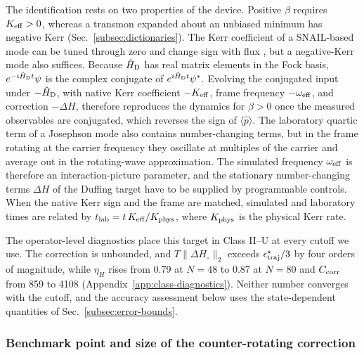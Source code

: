 \documentclass[pra,twocolumn,superscriptaddress,nofootinbib,floatfix]{revtex4-2}
\theoremstyle{remark}
\newcommand{\revcolor}{\color{blue}}
\DeclareRobustCommand{\rev}[1]{{\revcolor #1}}
\begin{document}
\rev{The identification rests on two properties of the device.} \rev{Positive \(\beta\) requires \(K_{\rm eff}>0\), whereas a transmon expanded about an unbiased minimum has negative Kerr (Sec.~\ref{subsec:dictionaries}).} \rev{The Kerr coefficient of a SNAIL-based mode can be tuned through zero and change sign with flux \cite{Sivak2019Kerrfree}, but a negative-Kerr mode also suffices.} \rev{Because \(\hat H_{\rm D}\) has real matrix elements in the Fock basis, \(e^{-i\hat H_{\rm D}t}\psi\) is the complex conjugate of \(e^{i\hat H_{\rm D}t}\psi^*\).} \rev{Evolving the conjugated input under \(-\hat H_{\rm D}\), with native Kerr coefficient \(-K_{\rm eff}\), frame frequency \(-\omega_{\rm eff}\), and correction \(-\Delta H\), therefore reproduces the dynamics for \(\beta>0\) once the measured observables are conjugated, which reverses the sign of \(\langle\hat p\rangle\).} \rev{The laboratory quartic term of a Josephson mode also contains number-changing terms, but in the frame rotating at the carrier frequency they oscillate at multiples of the carrier and average out in the rotating-wave approximation.} \rev{The simulated frequency \(\omega_{\rm eff}\) is therefore an interaction-picture parameter, and the stationary number-changing terms \(\Delta H\) of the Duffing target have to be supplied by programmable controls.} \rev{When the native Kerr sign and the frame are matched, simulated and laboratory times are related by \(t_{\rm lab}=t\,K_{\rm eff}/K_{\rm phys}\), where \(K_{\rm phys}\) is the physical Kerr rate.}

\rev{The operator-level diagnostics place this target in Class II--U at every cutoff we use.} \rev{The correction is unbounded, and \(T\|\Delta H_\circ\|_2\) exceeds \(\epsilon^\star_{\rm traj}/3\) by four orders of magnitude, while \(\eta_H\) rises from 0.79 at \(N=48\) to 0.87 at \(N=80\) and \(C_{\rm corr}\) from 859 to 4108 (Appendix~\ref{app:class-diagnostics}).} \rev{Neither number converges with the cutoff, and the accuracy assessment below uses the state-dependent quantities of Sec.~\ref{subsec:error-bounds}.}

\subsubsection{Benchmark point and size of the counter-rotating correction}
\label{subsec:df-eta}
\end{document}
